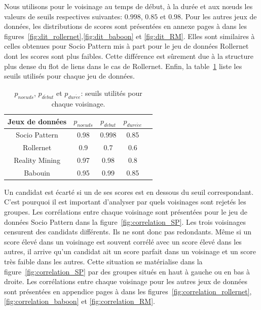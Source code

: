
Nous utilisons pour le voisinage au temps de début, à la durée et aux n\oe{}uds les valeurs de seuils respectives suivantes: $0.998$, $0.85$ et $0.98$.
Pour les autres jeux de données, les distributions de scores sont présentées en annexe pages \pageref{fig:dit_rollernet} à \pageref{fig:dit_RM} dans les figures~\ref{fig:dit_rollernet},\ref{fig:dit_baboon} et \ref{fig:dit_RM}.
Elles sont similaires à celles obtenues pour Socio Pattern mis à part pour le jeu de données Rollernet dont les scores sont plus faibles.
Cette différence est sûrement due à la structure plus dense du flot de liens dans le cas de Rollernet.
Enfin, la table~\ref{tab:thresholds} liste les seuils utilisés pour chaque jeu de données.
\begin{table}
\centering
\begin{tabular}{|c|c|c|c|c|}
\hline \rule[-1ex]{0pt}{3.5ex}
Jeux de données & $p_{noeuds}$ & $p_{d\acute{e}but}$ & $p_{dure\acute{e}e}$\\
\hline
Socio Pattern & 0.98 & 0.998 & 0.85 \\
Rollernet& 0.9 & 0.7 & 0.6 \\
Reality Mining & 0.97 & 0.98 & 0.8 \\
Babouin & 0.95 & 0.99 & 0.85 \\
\hline
\end{tabular}
\caption{$p_{noeuds}$, $p_{d\acute{e}but}$ et $p_{dur\acute{e}e}$: seuils utilités pour chaque voisinage.}
\label{tab:thresholds} %
\end{table}

Un candidat est écarté si un de ses scores est en dessous du seuil correspondant. 
C'est pourquoi il est important d'analyser par quels voisinages sont rejetés les groupes.
Les corrélations entre chaque voisinage sont présentées pour le jeu de données Socio Pattern dans la figure~\ref{fig:correlation_SP}.
Les trois voisinages censurent des candidats différents.
Ils ne sont donc pas redondants.
Même si un score élevé dans un voisinage est souvent corrélé avec un score élevé dans les autres, il arrive qu'un candidat ait un score parfait dans un voisinage et un score très faible dans les autres.
Cette situation se matérialise dans la figure~\ref{fig:correlation_SP} par des groupes situés en haut à gauche ou en bas à droite.
Les corrélations entre chaque voisinage pour les autres jeux de données sont présentées en appendice pages \pageref{fig:correlation_rollernet} à \pageref{fig:correlation_RM} dans les figures~\ref{fig:correlation_rollernet},\ref{fig:correlation_baboon} et \ref{fig:correlation_RM}.


